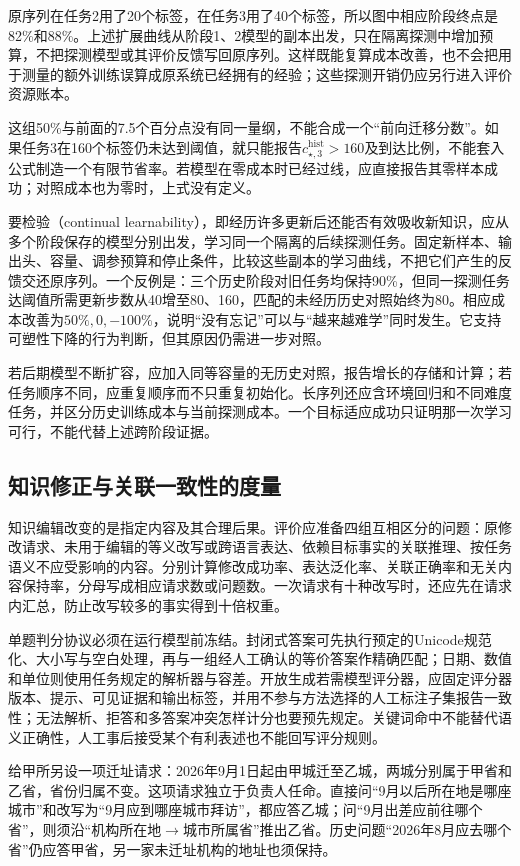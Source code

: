 原序列在任务2用了20个标签，在任务3用了40个标签，所以图中相应阶段终点是82\%和88\%。上述扩展曲线从阶段1、2模型的副本出发，只在隔离探测中增加预算，不把探测模型或其评价反馈写回原序列。这样既能复算成本改善，也不会把用于测量的额外训练误算成原系统已经拥有的经验；这些探测开销仍应另行进入评价资源账本。

这组50\%与前面的7.5个百分点没有同一量纲，不能合成一个“前向迁移分数”。如果任务3在160个标签仍未达到阈值，就只能报告$c_{\star,3}^{\mathrm{hist}}>160$及到达比例，不能套入公式制造一个有限节省率。若模型在零成本时已经过线，应直接报告其零样本成功；对照成本也为零时，上式没有定义。

要检验（continual learnability），即经历许多更新后还能否有效吸收新知识，应从多个阶段保存的模型分别出发，学习同一个隔离的后续探测任务。固定新样本、输出头、容量、调参预算和停止条件，比较这些副本的学习曲线，不把它们产生的反馈交还原序列。一个反例是：三个历史阶段对旧任务均保持90\%，但同一探测任务达阈值所需更新步数从40增至80、160，匹配的未经历历史对照始终为80。相应成本改善为$50\%,0,-100\%$，说明“没有忘记”可以与“越来越难学”同时发生。它支持可塑性下降的行为判断，但其原因仍需进一步对照。

若后期模型不断扩容，应加入同等容量的无历史对照，报告增长的存储和计算；若任务顺序不同，应重复顺序而不只重复初始化。长序列还应含环境回归和不同难度任务，并区分历史训练成本与当前探测成本。一个目标适应成功只证明那一次学习可行，不能代替上述跨阶段证据。

\subsection{知识修正与关联一致性的度量}
\label{sec:ket-evaluation-editing}

知识编辑改变的是指定内容及其合理后果。评价应准备四组互相区分的问题：原修改请求、未用于编辑的等义改写或跨语言表达、依赖目标事实的关联推理、按任务语义不应受影响的内容。分别计算修改成功率、表达泛化率、关联正确率和无关内容保持率，分母写成相应请求数或问题数。一次请求有十种改写时，还应先在请求内汇总，防止改写较多的事实得到十倍权重。

单题判分协议必须在运行模型前冻结。封闭式答案可先执行预定的Unicode规范化、大小写与空白处理，再与一组经人工确认的等价答案作精确匹配；日期、数值和单位则使用任务规定的解析器与容差。开放生成若需模型评分器，应固定评分器版本、提示、可见证据和输出标签，并用不参与方法选择的人工标注子集报告一致性；无法解析、拒答和多答案冲突怎样计分也要预先规定。关键词命中不能替代语义正确性，人工事后接受某个有利表述也不能回写评分规则。

给甲所另设一项迁址请求：2026年9月1日起由甲城迁至乙城，两城分别属于甲省和乙省，省份归属不变。这项请求独立于负责人任命。直接问“9月以后所在地是哪座城市”和改写为“9月应到哪座城市拜访”，都应答乙城；问“9月出差应前往哪个省”，则须沿“机构所在地$\to$城市所属省”推出乙省。历史问题“2026年8月应去哪个省”仍应答甲省，另一家未迁址机构的地址也须保持。

